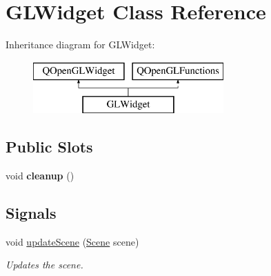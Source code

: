 \hypertarget{class_g_l_widget}{}\section{G\+L\+Widget Class Reference}
\label{class_g_l_widget}
Inheritance diagram for G\+L\+Widget\+:\begin{figure}[H]
\begin{center}
\leavevmode
\includegraphics[height=2.000000cm]{class_g_l_widget}
\end{center}
\end{figure}
\subsection*{Public Slots}
\begin{DoxyCompactItemize}
\item 
\mbox{\label{class_g_l_widget_a84c5673c0e92eac927220d368c505c94}} 
void {\bfseries cleanup} ()
\end{DoxyCompactItemize}
\subsection*{Signals}
\begin{DoxyCompactItemize}
\item 
void \mbox{\hyperlink{class_g_l_widget_a75a7f63bf253007d7dcbeee402e963d1}{update\+Scene}} (\mbox{\hyperlink{class_scene}{Scene}} scene)
\begin{DoxyCompactList}\small\item\em Updates the scene. \end{DoxyCompactList}\end{DoxyCompactItemize}
